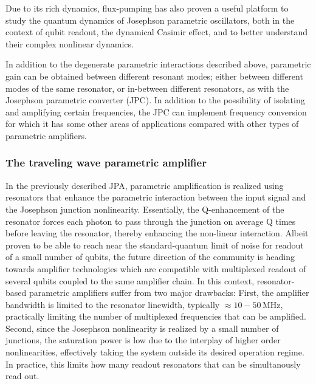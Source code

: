 \documentclass[aip,apr,twocolumn,showpacs,superscriptaddress,groupedaddress,nofootinbib,reprint]{revtex4-1}  %
\begin{document}
Due to its rich dynamics, flux-pumping has also proven a useful platform to study the quantum dynamics of Josephson parametric oscillators, both in the context of qubit readout\cite{Krantz2016,KrantzPhD2016,Lin2013,Lin2014}, the dynamical Casimir effect\cite{Johansson2009,Johansson2010,Wilson2011}, and to better understand their complex nonlinear dynamics\cite{Dykman1998,Wilson2010,Krantz2013,KrantzLic2013,Svensson2017a,Svensson2018,Bengtsson2018}.

In addition to the degenerate parametric interactions described above, parametric gain can be obtained between different resonant modes; either between different modes of the same resonator\cite{Simoen2015,SimoenPhD2015}, or in-between different resonators\cite{Eichler2014}, as with the Josephson parametric converter (JPC)\cite{Bergeal2010a,Bergeal2010b,Abdo2011,Abdo2013,FlurinPhD2014,Liu2017}. In addition to the possibility of isolating and amplifying certain frequencies, the JPC can implement frequency conversion for which it has some other areas of applications compared with other types of parametric amplifiers.

\subsubsection{\label{sec:TWPA}The traveling wave parametric amplifier}

In the previously described JPA, parametric amplification is realized using resonators that enhance the parametric interaction between the input signal and the Josephson junction nonlinearity. Essentially, the Q-enhancement of the resonator forces each photon to pass through the junction on average Q times before leaving the resonator, thereby enhancing the non-linear interaction. Albeit proven to be able to reach near the standard-quantum limit of noise for readout of a small number of qubits, the future direction of the community is heading towards amplifier technologies which are compatible with multiplexed readout of several qubits coupled to the same amplifier chain\cite{Chen2012,Jerger2012,Barends2014,Kelly2015,Chapman2017}. In this context, resonator-based parametric amplifiers suffer from two major drawbacks: First, the amplifier bandwidth is limited to the resonator linewidth, typically $\approx 10-50\,$MHz, practically limiting the number of multiplexed frequencies that can be amplified. Second, since the Josephson nonlinearity is realized by a small number of junctions, the saturation power is low due to the interplay of higher order nonlinearities, effectively taking the system outside its desired operation regime\cite{Dykman1998,Krantz2013,KrantzLic2013,Liu2017}. In practice, this limits how many readout resonators that can be simultanously read out.
\end{document}
